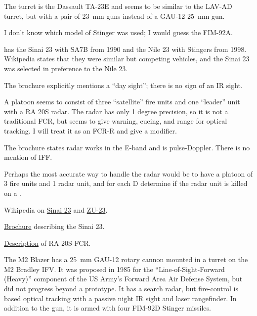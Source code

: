 \begin{withcounters}
{        The turret is the Dassault TA-23E and seems to be similar to the LAV-AD turret, but with a pair of 23~mm guns instead of a GAU-12 25~mm gun.

        I don't know which model of Stinger was used; I would guess the FIM-92A.

        {\MP} has the Sinai 23 with SA7B from 1990 and the Nile 23 with Stingers from 1998. Wikipedia states that they were similar but competing vehicles, and the Sinai 23 was selected in preference to the Nile 23.

        The brochure explicitly mentions a “day sight”; there is no sign of an IR sight.

        A platoon seems to consist of three “satellite” fire units and one “leader” unit with a RA 20S radar. The radar has only 1 degree precision, so it is not a traditional FCR, but seems to give warning, cueing, and range for optical tracking. I will treat it as an FCR-R and give a  modifier.

        The brochure states radar works in the E-band and is pulse-Doppler. There is no mention of IFF.

        Perhaps the most accurate way to handle the radar would be to have a platoon of 3 fire units and 1 radar unit, and for each D determine if the radar unit is killed on a .

        \begin{notesources}
            \item Wikipedia on \href{https://en.wikipedia.org/wiki/ZU-23-2\#Egypt}{Sinai 23} and \href{https://en.wikipedia.org/wiki/ZU-23-2}{ZU-23}.
            \item \href{https://forum.warthunder.com/t/british-weapon-systems-technical-data-and-discussion/3879/2233}{Brochure} describing the Sinai 23.
            \item \href{https://forum.warthunder.com/t/british-weapon-systems-technical-data-and-discussion/3879/2233}{Description} of RA 20S FCR.

        \end{notesources}
    }


    The M2 Blazer has a 25~mm GAU-12 rotary cannon mounted in a turret on the M2 Bradley IFV.
    It was proposed in 1985 for the “Line-of-Sight-Forward (Heavy)” component of the US Army's Forward Area Air Defense System, but did not progress beyond a prototype.
    It has a search radar, but fire-control is based optical tracking with a passive night IR sight and laser rangefinder.
    In addition to the gun, it is armed with four FIM-92D Stinger missiles.%
\end{withcounters}
